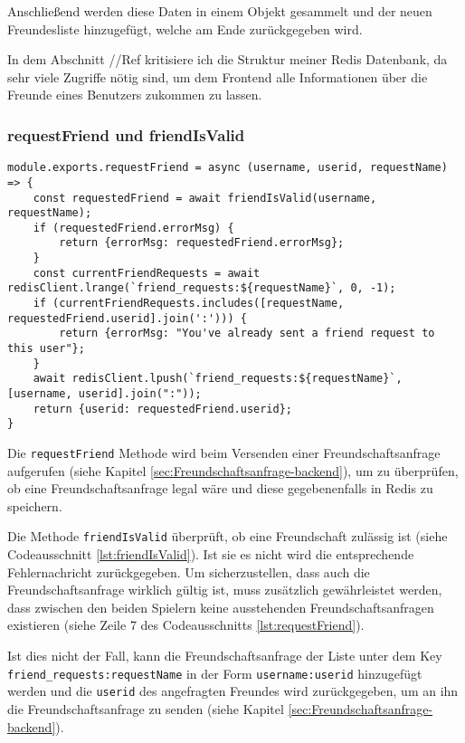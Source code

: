 Anschließend werden diese Daten in einem Objekt gesammelt und der neuen Freundesliste hinzugefügt, welche am Ende zurückgegeben wird.

In dem Abschnitt //Ref kritisiere ich die Struktur meiner Redis Datenbank, da sehr viele Zugriffe nötig sind, um dem Frontend alle Informationen über die Freunde eines Benutzers zukommen zu lassen.

\subsubsection{requestFriend und friendIsValid}
\label{sec:requestFriend}

\begin{lstlisting}[style=codeStyle, caption={requestFriend Methode um eine Freundschaftsanfrage in redis zu speichern}, label={lst:requestFriend}]
module.exports.requestFriend = async (username, userid, requestName) => {
    const requestedFriend = await friendIsValid(username, requestName);
    if (requestedFriend.errorMsg) {
        return {errorMsg: requestedFriend.errorMsg};
    }
    const currentFriendRequests = await redisClient.lrange(`friend_requests:${requestName}`, 0, -1);
    if (currentFriendRequests.includes([requestName, requestedFriend.userid].join(':'))) {
        return {errorMsg: "You've already sent a friend request to this user"};
    }
    await redisClient.lpush(`friend_requests:${requestName}`, [username, userid].join(":"));
    return {userid: requestedFriend.userid};
}
\end{lstlisting}

Die \verb|requestFriend| Methode wird beim Versenden einer Freundschaftsanfrage aufgerufen (siehe Kapitel \ref{sec:Freundschaftsanfrage-backend}), um zu überprüfen, ob eine Freundschaftsanfrage legal wäre und diese gegebenenfalls in Redis zu speichern.

Die Methode \verb|friendIsValid| überprüft, ob eine Freundschaft zulässig ist (siehe Codeausschnitt \ref{lst:friendIsValid}). Ist sie es nicht wird die entsprechende Fehlernachricht zurückgegeben. Um sicherzustellen, dass auch die Freundschaftsanfrage wirklich gültig ist, muss zusätzlich gewährleistet werden, dass zwischen den beiden Spielern keine ausstehenden Freundschaftsanfragen existieren (siehe Zeile 7 des Codeausschnitts \ref{lst:requestFriend}).

Ist dies nicht der Fall, kann die Freundschaftsanfrage der Liste unter dem Key \linebreak \verb|friend_requests:requestName| in der Form \verb|username:userid| hinzugefügt werden und die \verb|userid| des angefragten Freundes wird zurückgegeben, um an ihn die Freundschaftsanfrage zu senden (siehe Kapitel \ref{sec:Freundschaftsanfrage-backend}).

